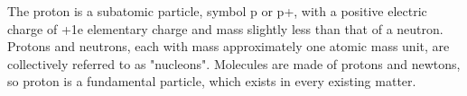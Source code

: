 The proton is a subatomic particle, symbol p or p+, with a positive electric charge of +1e elementary charge and mass slightly less than that of a neutron. Protons and neutrons, each with mass approximately one atomic mass unit, are collectively referred to as "nucleons". Molecules are made of protons and newtons, so proton is a fundamental particle, which exists in every existing matter.
